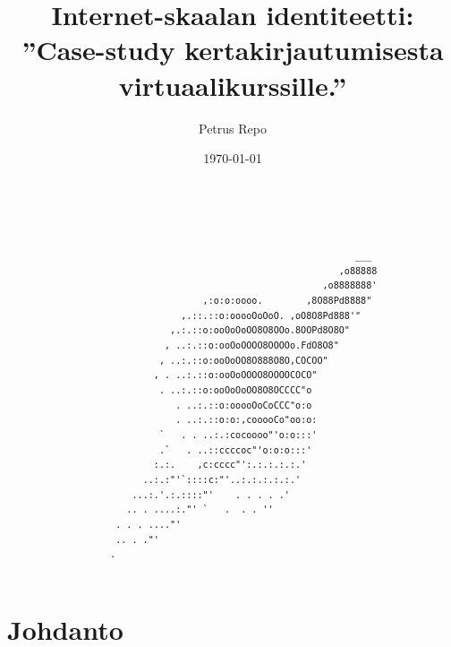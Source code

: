 \documentclass[finnish,gradu]{tktltiki}
\begin{document}
\title{Internet-skaalan identiteetti:
    \\ ''Case-study kertakirjautumisesta virtuaalikurssille.''}

\author{Petrus Repo}
\date{\today}
\maketitle


\onehalfspacing

\subject{Tietojenkäsittelytiede}


\begin{abstract}

  \begin{verbatim}




                                                            ___
                                                         ,o88888
                                                      ,o8888888'
                                ,:o:o:oooo.        ,8O88Pd8888"
                            ,.::.::o:ooooOoOoO. ,oO8O8Pd888'"
                          ,.:.::o:ooOoOoOO8O8OOo.8OOPd8O8O"
                         , ..:.::o:ooOoOOOO8OOOOo.FdO8O8"
                        , ..:.::o:ooOoOO8O888O8O,COCOO"
                       , . ..:.::o:ooOoOOOO8OOOOCOCO"
                        . ..:.::o:ooOoOoOO8O8OCCCC"o
                           . ..:.::o:ooooOoCoCCC"o:o
                           . ..:.::o:o:,cooooCo"oo:o:
                        `   . . ..:.:cocoooo"'o:o:::'
                        .`   . ..::ccccoc"'o:o:o:::'
                       :.:.    ,c:cccc"':.:.:.:.:.'
                     ..:.:"'`::::c:"'..:.:.:.:.:.'
                   ...:.'.:.::::"'    . . . . .'
                  .. . ....:."' `   .  . . ''
                . . . ...."'
                .. . ."'
               .

  \end{verbatim}

\end{abstract}

\setcounter{tocdepth}{3}
\mytableofcontents

\section{Johdanto} %
\label{sec:johdanto}
\end{document}
